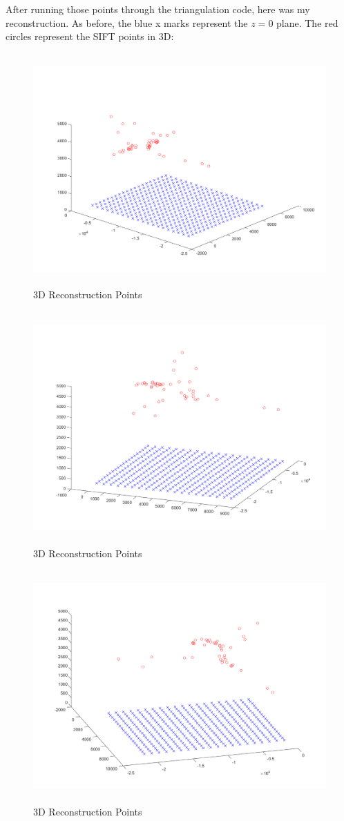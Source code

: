 \documentclass[11pt,psfig]{article}
\begin{document}
After running those points through the triangulation code, here was my reconstruction. As before, the blue x marks represent the $z=0$ plane. The red circles represent the SIFT points in 3D:
\begin{figure}[H]
\centering
\includegraphics[height=3.5in]{sfmResults1/triangulationAttemptSIFT1.png}
\caption{3D Reconstruction Points}
\end{figure}
\begin{figure}[H]
\centering
\includegraphics[height=3.5in]{sfmResults1/triangulationAttemptSIFT2.png}
\caption{3D Reconstruction Points}
\end{figure}
\begin{figure}[H]
\centering
\includegraphics[height=3.5in]{sfmResults1/triangulationAttemptSIFT3.png}
\caption{3D Reconstruction Points}
\end{figure}
\end{document}
